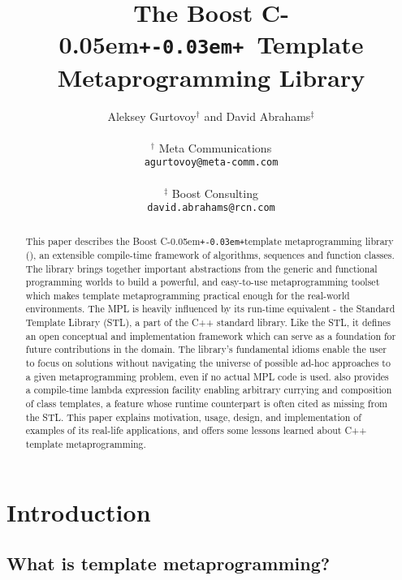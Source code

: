 \documentclass{netobjectdays}
\newcommand{\Cpp}{C\kern-0.05em\texttt{+\kern-0.03em+}}
\newcommand{\mpl}{\code{boost::mpl}}
\begin{document}
\title{The Boost \Cpp\ Template Metaprogramming Library}

\author{Aleksey Gurtovoy$^\dag$ and David Abrahams$^\ddag$ \\
\\
$^\dag$ Meta Communications \\
\texttt{agurtovoy@meta-comm.com}\\
\\
$^\ddag$ Boost Consulting \\
\texttt{david.abrahams@rcn.com}
}

\maketitle

\begin{abstract} $\!$This paper describes the Boost \Cpp template
metaprogramming library (\mpl), an extensible compile-time framework
of algorithms, sequences and function classes. The library brings
together important abstractions from the generic and functional
programming worlds to build a powerful, and easy-to-use
metaprogramming toolset which makes template metaprogramming practical
enough for the real-world environments. The MPL is heavily influenced
by its run-time equivalent - the Standard Template Library (STL), a
part of the C++ standard library. Like the STL, it defines an open
conceptual and implementation framework which can serve as a
foundation for future contributions in the domain. The library's
fundamental idioms enable the user to focus on solutions without
navigating the universe of possible ad-hoc approaches to a given
metaprogramming problem, even if no actual MPL code is used. {\mpl}
also provides a compile-time lambda expression facility enabling
arbitrary currying and composition of class templates, a feature whose
runtime counterpart is often cited as missing from the STL. This paper
explains motivation, usage, design, and implementation of \mpl
examples of its real-life applications, and offers some lessons
learned about C++ template metaprogramming.\end{abstract}


\section{Introduction}
\subsection{What is template metaprogramming? }
\end{document}
